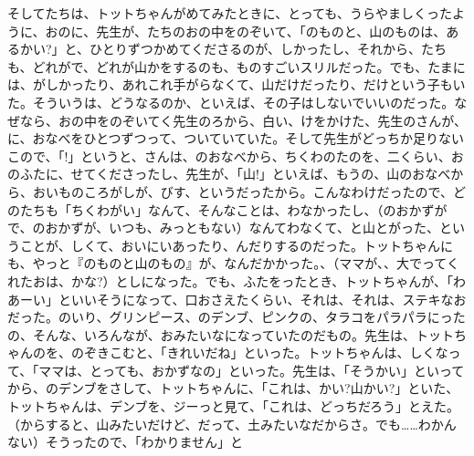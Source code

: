 そしてたちは、トットちゃんがめてみたときに、とっても、うらやましくったように、おのに、先生が、たちのおの中をのぞいて、「のものと、山のものは、あるかい?」と、ひとりずつかめてくださるのが、しかったし、それから、たちも、どれがで、どれが山かをするのも、ものすごいスリルだった。でも、たまには、がしかったり、あれこれ手がらなくて、山だけだったり、だけという子もいた。そういうは、どうなるのか、といえば、その子はしないでいいのだった。なぜなら、おの中をのぞいてく先生のろから、白い、けをかけた、先生のさんが、に、おなべをひとつずつって、ついていていた。そして先生がどっちか足りないこので、「!」というと、さんは、のおなべから、ちくわのたのを、二くらい、おのふたに、せてくださったし、先生が、「山!」といえば、もうの、山のおなべから、おいものころがしが、びす、というだったから。こんなわけだったので、どのたちも「ちくわがい」なんて、そんなことは、わなかったし、（のおかずがで、のおかずが、いつも、みっともない）なんてわなくて、と山とがった、ということが、しくて、おいにいあったり、んだりするのだった。トットちゃんにも、やっと『のものと山のもの』が、なんだかかった。、（ママが、、大でってくれたおは、かな?）としになった。でも、ふたをったとき、トットちゃんが、「わあーい」といいそうになって、口おさえたくらい、それは、それは、ステキなおだった。のいり、グリンピース、のデンブ、ピンクの、タラコをパラパラにったの、そんな、いろんなが、おみたいなになっていたのだもの。先生は、トットちゃんのを、のぞきこむと、「きれいだね」といった。トットちゃんは、しくなって、「ママは、とっても、おかずなの」といった。先生は、「そうかい」といってから、のデンブをさして、トットちゃんに、「これは、かい?山かい?」といた、トットちゃんは、デンブを、ジーっと見て、「これは、どっちだろう」とえた。（からすると、山みたいだけど、だって、土みたいなだからさ。でも……わかんない）そうったので、「わかりません」と